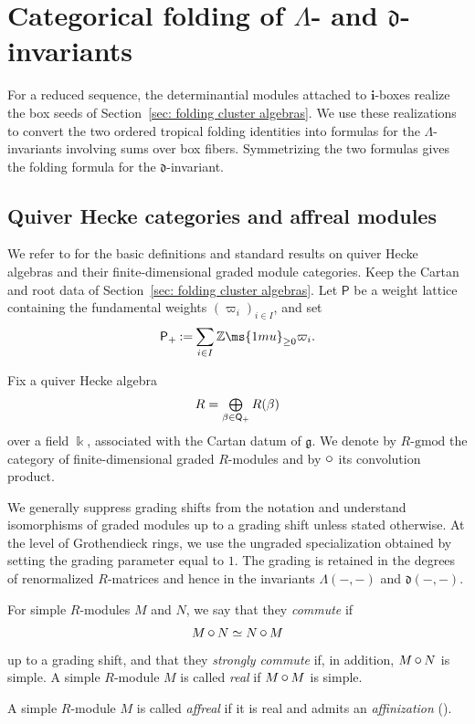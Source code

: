 \documentclass[12pt, leqno]{amsart}
\numberwithin{equation}{section}
\theoremstyle{plain}
\theoremstyle{definition}
\newcommand{\seteq}{\mathbin{:=}}
\newcommand{\conv}{\mathop{\mathbin{\mbox{\large $\circ$}}}}
\newcommand{\soplus}{\mathop{\mbox{\normalsize$\bigoplus$}}\limits}
\newcommand{\g}{\mathfrak{g}}
\newcommand{\Z}{\mathbb{Z}\ms{1mu}}
\newcommand{\de}{\mathfrak{d}}
\newcommand{\sfP}{\mathsf{P}}
\newcommand{\sfQ}{\mathsf{Q}}
\newcommand{\bfi}{\mathbf{i}}
\begin{document}
\section{Categorical folding of
\texorpdfstring{\(\Lambda\)}{Lambda}- and
\texorpdfstring{\(\de\)}{d}-invariants}
\label{sec: categorical folding}

For a reduced sequence, the determinantial modules attached to \(\bfi\)-boxes realize the
box seeds of Section~\ref{sec: folding cluster algebras}.  We use
these realizations to convert the two ordered tropical folding
identities into formulas for the \(\Lambda\)-invariants involving sums over box fibers.
Symmetrizing the two formulas gives the folding formula for the
\(\de\)-invariant.

\subsection{Quiver Hecke categories and affreal modules}
\label{subsec: quiver Hecke box modules}
We refer to \cite{KKKO18} for the basic definitions and standard
results on quiver Hecke algebras and their finite-dimensional graded
module categories. 
Keep the Cartan and root data of
Section~\ref{sec: folding cluster algebras}.
Let \(\sfP\) be a weight lattice containing the fundamental weights
\((\varpi_i)_{i\in I}\), and set
\[
\sfP_+\seteq\sum_{i\in I}\Z_{\geq0}\varpi_i.
\]

Fix a quiver Hecke algebra \cite{KL1,KL2,R08}
\[
R=\soplus_{\beta\in\sfQ_+}R(\beta)
\]
over a field $\Bbbk$, associated with the Cartan datum of \(\g\).  We denote by
\(R\text{-gmod}\) the category of finite-dimensional graded
\(R\)-modules and by \(\conv\) its convolution product.

We generally suppress grading shifts from the notation and understand
isomorphisms of graded modules up to a grading shift unless stated
otherwise.  At the level of Grothendieck rings, we use the ungraded
specialization obtained by setting the grading parameter equal to
\(1\).  The grading is retained in the degrees of renormalized
\(R\)-matrices and hence in the invariants \(\Lambda(-,-)\) and
\(\de(-,-)\).

For simple \(R\)-modules \(M\) and \(N\), we say that they
\emph{commute} if
\[
M\conv N\simeq N\conv M
\]
up to a grading shift, and that they \emph{strongly commute} if, in
addition, \(M\conv N\) is simple.  A simple \(R\)-module \(M\) is
called \emph{real} if \(M\conv M\) is simple.

A simple \(R\)-module \(M\) is called \emph{affreal} if it is real
and admits an \emph{affinization} (\cite{KP18,KKOP21}).
\end{document}
